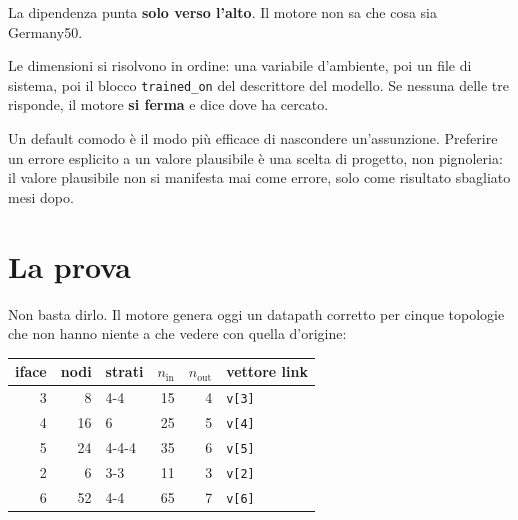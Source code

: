 \documentclass[11pt,a4paper,oneside]{report}
\begin{document}
\begin{center}
\end{center}

La dipendenza punta \textbf{solo verso l'alto}. Il motore non sa che cosa sia
Germany50.

Le dimensioni si risolvono in ordine: una variabile d'ambiente, poi un file di
sistema, poi il blocco \texttt{trained\_on} del descrittore del modello. Se
nessuna delle tre risponde, il motore \textbf{si ferma} e dice dove ha cercato.

\begin{lezione}
Un default comodo è il modo più efficace di nascondere un'assunzione. Preferire
un errore esplicito a un valore plausibile è una scelta di progetto, non
pignoleria: il valore plausibile non si manifesta mai come errore, solo come
risultato sbagliato mesi dopo.
\end{lezione}

\section{La prova}

Non basta dirlo. Il motore genera oggi un datapath corretto per cinque
topologie che non hanno niente a che vedere con quella d'origine:

\begin{center}
\small
\begin{tabular}{@{}rrlrrl@{}}
\toprule
\textbf{iface} & \textbf{nodi} & \textbf{strati} & $n_{\text{in}}$ & $n_{\text{out}}$ & \textbf{vettore link} \\
\midrule
3 &  8 & 4-4     & 15 & 4 & \texttt{v[3]} \\
4 & 16 & 6       & 25 & 5 & \texttt{v[4]} \\
5 & 24 & 4-4-4   & 35 & 6 & \texttt{v[5]} \\
2 &  6 & 3-3     & 11 & 3 & \texttt{v[2]} \\
6 & 52 & 4-4     & 65 & 7 & \texttt{v[6]} \\
\bottomrule
\end{tabular}
\end{center}
\end{document}
